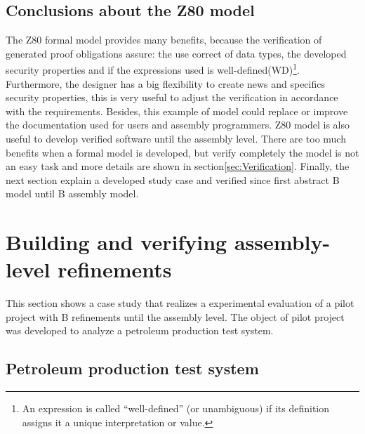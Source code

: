 \documentclass[11pt]{article} %
\begin{document}


\subsection{Conclusions about the Z80 model}



The Z80 formal model provides many benefits, because the verification of generated proof obligations assure: 
the use correct of data types, the developed security properties  and if the expressions used is well-defined(WD)\footnote{An expression
is called ``well-defined'' (or unambiguous) if its definition assigns it a unique interpretation or value.}. Furthermore, the designer has
a big flexibility to create news and specifics security properties, this is very useful to adjust the verification in accordance with the requirements.
Besides, this example of model could replace or improve the documentation used for users and assembly programmers. Z80 model is also useful to
develop verified software  until the assembly level. There are too much benefits when a formal model is developed, 
but verify completely the model is not an easy task and more details are shown in section\ref{sec:Verification}. 
Finally, the next section explain a developed study case and verified since first abstract B model until B assembly model.   

\section{Building and verifying assembly-level refinements}
\label{sec:studycase}


This section shows a case study that realizes a experimental evaluation of
a pilot project with B refinements until the assembly level. The object of pilot
project was developed to analyze a petroleum production test system.  



\subsection{Petroleum production test system}
\end{document}
